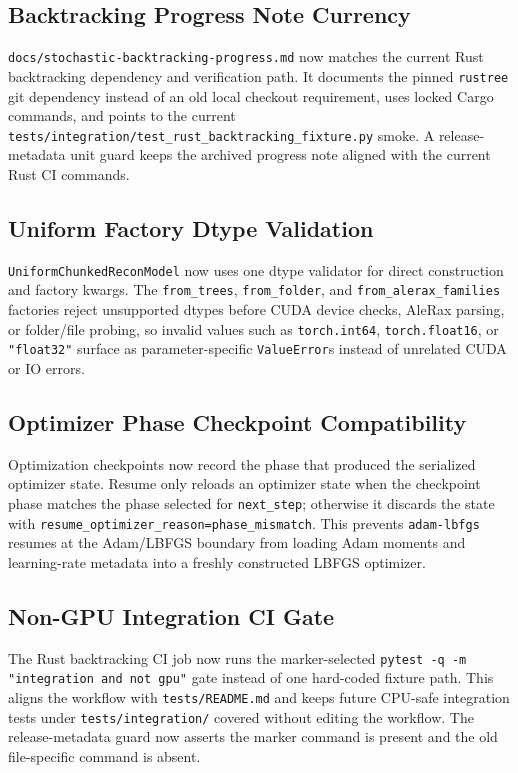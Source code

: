 \documentclass[11pt]{article}
\begin{document}
\subsection{Backtracking Progress Note Currency}

\texttt{docs/stochastic-backtracking-progress.md} now matches the current Rust
backtracking dependency and verification path.  It documents the pinned
\texttt{rustree} git dependency instead of an old local checkout requirement,
uses locked Cargo commands, and points to the current
\texttt{tests/integration/test\_rust\_backtracking\_fixture.py} smoke.  A
release-metadata unit guard keeps the archived progress note aligned with the
current Rust CI commands.

\subsection{Uniform Factory Dtype Validation}

\texttt{UniformChunkedReconModel} now uses one dtype validator for direct
construction and factory kwargs.  The \texttt{from\_trees},
\texttt{from\_folder}, and \texttt{from\_alerax\_families} factories reject
unsupported dtypes before CUDA device checks, AleRax parsing, or folder/file
probing, so invalid values such as \texttt{torch.int64},
\texttt{torch.float16}, or \texttt{"float32"} surface as parameter-specific
\texttt{ValueError}s instead of unrelated CUDA or IO errors.

\subsection{Optimizer Phase Checkpoint Compatibility}

Optimization checkpoints now record the phase that produced the serialized
optimizer state.  Resume only reloads an optimizer state when the checkpoint
phase matches the phase selected for \texttt{next\_step}; otherwise it discards
the state with \texttt{resume\_optimizer\_reason=phase\_mismatch}.  This
prevents \texttt{adam-lbfgs} resumes at the Adam/LBFGS boundary from loading
Adam moments and learning-rate metadata into a freshly constructed LBFGS
optimizer.

\subsection{Non-GPU Integration CI Gate}

The Rust backtracking CI job now runs the marker-selected
\texttt{pytest -q -m "integration and not gpu"} gate instead of one hard-coded
fixture path.  This aligns the workflow with \texttt{tests/README.md} and keeps
future CPU-safe integration tests under \texttt{tests/integration/} covered
without editing the workflow.  The release-metadata guard now asserts the
marker command is present and the old file-specific command is absent.
\end{document}
